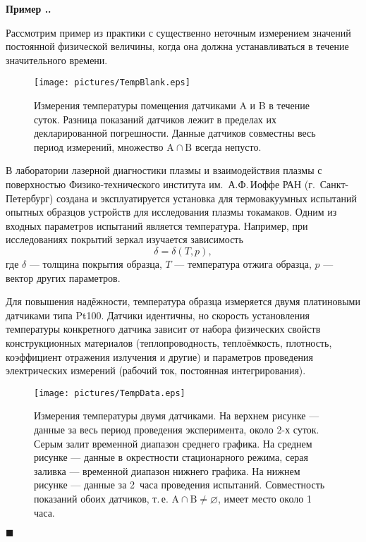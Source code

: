 \documentclass[a5paper,openany]{book}
\newcommand{\mrm}{\mathrm}
\newcounter{ExmpNum}[section]
\renewcommand{\theExmpNum}{\thesection.\arabic{ExmpNum}}
\newcounter{BazhenovExmp}
\newenvironment{example}%
  {\refstepcounter{ExmpNum}%
  \par\addvspace{\medskipamount} 
  \noindent\textbf{Пример {\theExmpNum}.}
  }%
  {\hfill$\blacksquare$\par\medskip}
\begin{document}
\begin{example} 
\label{BazhenovExmp} 
Рассмотрим пример из практики с существенно неточным измерением значений постоянной 
физической величины, когда она должна устанавливаться в течение значительного времени. 
   
  
\begin{figure}[ht]
\centering
\texttt{[image: pictures/TempBlank.eps]}
\caption{Измерения температуры помещения датчиками A и B в течение суток. Разница 
показаний датчиков лежит в пределах их декларированной погрешности. Данные датчиков 
совместны весь период измерений, множество $\mrm{A}\cap\mrm{B}$ всегда непусто.} 
\label{SensorTestPic} 
\end{figure}  
  

В лаборатории лазерной диагностики плазмы и взаимодействия плазмы с поверхностью 
Физико-технического института им.~А.Ф.\,Иоффе РАН (г.~Санкт-Петербург) создана 
и эксплуатируется установка \cite{PTE2021} для термовакуумных испытаний опытных 
образцов устройств для исследования плазмы токамаков. Одним из входных параметров 
испытаний является температура. Например, при исследованиях покрытий зеркал 
изучается зависимость 
\begin{equation*}
\delta = \delta(T, p),
\end{equation*}
где $\delta$ --- толщина покрытия образца, $T$ --- температура отжига образца, 
$p$ --- вектор других параметров. 
    
Для повышения надёжности, температура образца измеряется двумя платиновыми датчиками 
типа Pt100. Датчики идентичны, но скорость установления температуры конкретного датчика 
зависит от набора физических свойств конструкционных материалов (теплопроводность, 
теплоёмкость, плотность, коэффициент отражения излучения и другие) и параметров 
проведения электрических измерений (рабочий ток, постоянная интегрирования). 
  
  
\begin{figure}[ht] 
\centering
\texttt{[image: pictures/TempData.eps]}
\caption{Измерения температуры двумя датчиками. На верхнем рисунке --- данные 
за весь период проведения эксперимента, около 2-х суток. Серым залит временной 
диапазон среднего графика. На среднем рисунке --- данные в окрестности стационарного 
режима, серая заливка --- временной диапазон нижнего графика. На нижнем рисунке 
--- данные за 2~часа проведения испытаний. Совместность показаний обоих датчиков, 
т.\,е. $\mrm{A}\cap\mrm{B}\neq\varnothing$, имеет место около 1 часа.} 
\label{2SensorsPic} 
\end{figure}
  

\end{example}
\end{document}
